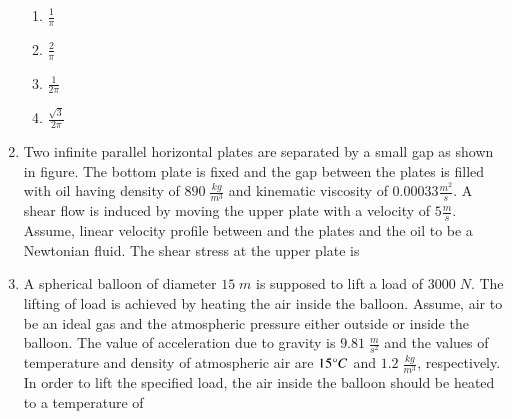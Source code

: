 \documentclass[journal,12pt,onecolumn]{IEEEtran}
\theoremstyle{remark}
\begin{document}
\begin{enumerate}[start=27]
\begin{figure}[!ht]
\label{fig:my_label}
\end{figure}
\begin{enumerate}
    \item $\frac{1}{\pi}$
    \item $\frac{2}{\pi}$
    \item $\frac{1}{2\pi}$
    \item $\frac{\sqrt{3}}{2\pi}$
\end{enumerate}
\item Two infinite parallel horizontal plates are separated by a small gap  as shown in figure. The bottom plate is fixed and the gap between the plates is filled with oil having density of $890\;\frac{kg}{m^3}$ and kinematic viscosity of $0.00033\frac{m^2}{s}$. A shear flow is induced by moving the upper plate with a velocity of $5 \frac{m}{s}$. Assume, linear velocity profile between and the plates and the oil to be a Newtonian fluid. The shear stress  at the upper plate is \underline{\hspace{2cm}}
\begin{figure}[H]
\centering
{}%
\end{figure}
\item A spherical balloon of diameter $15\;m$ is supposed to lift a load of $3000\;N$. The lifting of load is achieved by heating the air inside the balloon. Assume, air to be an ideal gas and the atmospheric pressure either outside or inside the balloon. The value of acceleration due to gravity is $9.81\;\frac{m}{s^2}$ and the values of temperature and density of atmospheric air are $15\degree C$ and $1.2\;\frac{kg}{m^3}$, respectively. In order to lift the specified load, the air inside the balloon should be heated to a temperature  of \underline{\hspace{2cm}} 

\end{enumerate}
\end{document}
